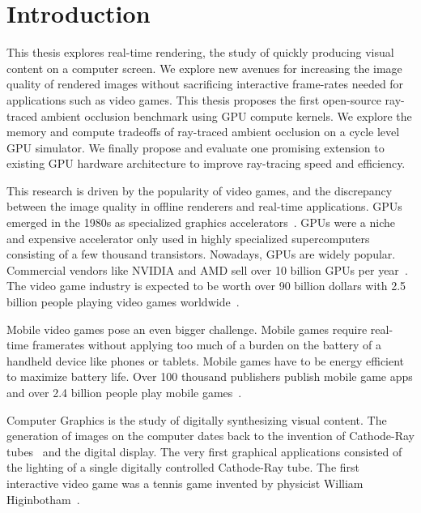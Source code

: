 \chapter{Introduction}
\label{ch:Introduction}

This thesis explores real-time rendering, the study of quickly producing visual content on a computer screen. We explore new avenues for increasing the image quality of rendered images without sacrificing interactive frame-rates needed for applications such as video games. This thesis proposes the first open-source ray-traced ambient occlusion benchmark using GPU compute kernels. We explore the memory and compute tradeoffs of ray-traced ambient occlusion on a cycle level GPU simulator. We finally propose and evaluate one promising extension to existing GPU hardware architecture to improve ray-tracing speed and efficiency. 

This research is driven by the popularity of video games, and the discrepancy between the image quality in offline renderers and real-time applications. GPUs emerged in the 1980s as specialized graphics accelerators~\cite{McClanahan2011HistoryAE}. GPUs were a niche and expensive accelerator only used in highly specialized supercomputers consisting of a few thousand transistors. Nowadays, GPUs are widely popular. Commercial vendors like NVIDIA and AMD sell over 10 billion GPUs per year~\cite{GPU_sales}. The video game industry is expected to be worth over 90 billion dollars with 2.5 billion people playing video games worldwide~\cite{gaming_stats_website}.

Mobile video games pose an even bigger challenge. Mobile games require real-time framerates without applying too much of a burden on the battery of a handheld device like phones or tablets. Mobile games have to be energy efficient to maximize battery life. Over 100 thousand publishers publish mobile game apps and over 2.4 billion people play mobile games~\cite{https://www.ironsrc.com/blog/mobile-gaming-industry-trends-in-2020/}. 

Computer Graphics is the study of digitally synthesizing visual content. The generation of images on the computer dates back to the invention of Cathode-Ray tubes~\cite{cathoderaytube} and the digital display. The very first graphical applications consisted of the lighting of a single digitally controlled Cathode-Ray tube. The first interactive video game was a tennis game invented by physicist William Higinbotham~\cite{APS-physics}.


